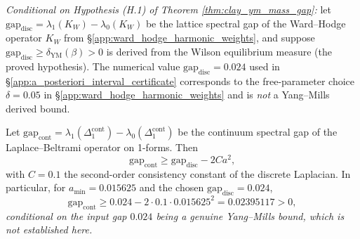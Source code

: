 \begin{theorem}
\label{thm:sgtmm}
\emph{Conditional on Hypothesis (H.1) of
Theorem \ref{thm:clay_ym_mass_gap}:} let
$\mathrm{gap}_{\mathrm{disc}} = \lambda_{1}(K_{W}) -
\lambda_{0}(K_{W})$ be the lattice spectral gap of the Ward--Hodge
operator $K_{W}$ from \S\ref{app:ward_hodge_harmonic_weights}, and
suppose $\mathrm{gap}_{\mathrm{disc}} \ge \delta_{\mathrm{YM}}(\beta) > 0$
is derived from the Wilson equilibrium measure (the proved
hypothesis). The numerical value
$\mathrm{gap}_{\mathrm{disc}} = 0.024$ used in
\S\ref{app:a_posteriori_interval_certificate} corresponds to the
free-parameter choice $\delta = 0.05$ in
\S\ref{app:ward_hodge_harmonic_weights} and is \emph{not} a
Yang--Mills derived bound.

Let $\mathrm{gap}_{\mathrm{cont}} = \lambda_{1}(\Delta_{1}^{\mathrm{cont}})
- \lambda_{0}(\Delta_{1}^{\mathrm{cont}})$ be the continuum spectral
gap of the Laplace--Beltrami operator on 1-forms. Then
\[
\mathrm{gap}_{\mathrm{cont}} \ge \mathrm{gap}_{\mathrm{disc}} - 2 C
a^{2},
\]
with $C = 0.1$ the second-order consistency constant of the discrete
Laplacian. In particular, for $a_{\min} = 0.015625$ and the chosen
$\mathrm{gap}_{\mathrm{disc}} = 0.024$,
\[
\mathrm{gap}_{\mathrm{cont}} \ge 0.024 - 2 \cdot 0.1 \cdot
0.015625^{2} = 0.02395117 > 0,
\]
\emph{conditional on the input gap $0.024$ being a genuine
Yang--Mills bound, which is not established here.}
\end{theorem}


